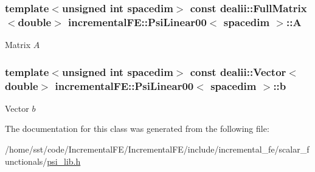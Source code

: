 \subsubsection[{\texorpdfstring{A}{A}}]{\setlength{\rightskip}{0pt plus 5cm}template$<$unsigned int spacedim$>$ const dealii\+::\+Full\+Matrix$<$double$>$ {\bf incremental\+F\+E\+::\+Psi\+Linear00}$<$ spacedim $>$\+::A\hspace{0.3cm}{\ttfamily [private]}}\hypertarget{classincremental_f_e_1_1_psi_linear00_a6d4534350ad8b74c6930c3afa1031801}{}\label{classincremental_f_e_1_1_psi_linear00_a6d4534350ad8b74c6930c3afa1031801}
Matrix $A$ 
\subsubsection[{\texorpdfstring{b}{b}}]{\setlength{\rightskip}{0pt plus 5cm}template$<$unsigned int spacedim$>$ const {\bf dealii\+::\+Vector}$<$double$>$ {\bf incremental\+F\+E\+::\+Psi\+Linear00}$<$ spacedim $>$\+::b\hspace{0.3cm}{\ttfamily [private]}}\hypertarget{classincremental_f_e_1_1_psi_linear00_ab16d4f5295fc2637f0f7662843d4cac1}{}\label{classincremental_f_e_1_1_psi_linear00_ab16d4f5295fc2637f0f7662843d4cac1}
Vector $b$ 

The documentation for this class was generated from the following file\+:\begin{DoxyCompactItemize}
\item 
/home/sst/code/\+Incremental\+F\+E/\+Incremental\+F\+E/include/incremental\+\_\+fe/scalar\+\_\+functionals/\hyperlink{psi__lib_8h}{psi\+\_\+lib.\+h}\end{DoxyCompactItemize}
